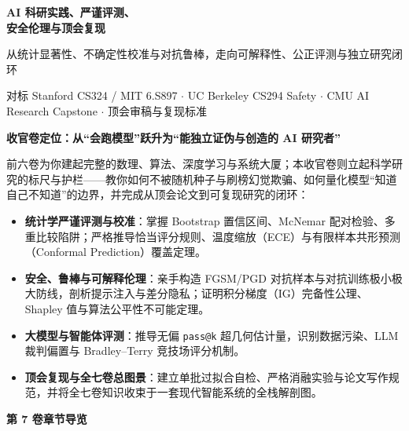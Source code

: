 \documentclass[UTF8,10.5pt,a4paper,oneside,fontset=fandol,scheme=plain]{ctexbook}
\begin{document}
{\fontsize{25}{33}\selectfont\sffamily\bfseries\color{ink}AI 科研实践、严谨评测、\\安全伦理与顶会复现}\par
\vspace{2.5mm}
{\large\sffamily\color{teal}从统计显著性、不确定性校准与对抗鲁棒，走向可解释性、公正评测与独立研究闭环}\par
\vspace{4.5mm}
{\small\color{slate}对标 Stanford CS324 / MIT 6.S897 $\cdot$ UC Berkeley CS294 Safety $\cdot$ CMU AI Research Capstone $\cdot$ \mbox{顶会审稿与复现标准}}\par

\vspace{5.5mm}

\begin{tcolorbox}[
  enhanced,
  colback=tealLight,
  colframe=tealLine,
  borderline west={2.6pt}{0pt}{tealDark},
  arc=2mm,
  boxrule=0.5pt,
  left=4.5mm,right=4.5mm,top=3mm,bottom=3mm
]
\textbf{\sffamily\color{tealDark}收官卷定位：从“会跑模型”跃升为“能独立证伪与创造的 AI 研究者”}\par\vspace{1.2mm}
\small
前六卷为你建起完整的数理、算法、深度学习与系统大厦；本收官卷则立起科学研究的标尺与护栏——教你如何不被随机种子与刷榜幻觉欺骗、如何量化模型“知道自己不知道”的边界，并完成从顶会论文到可复现研究的闭环：
\begin{itemize}
  \item \textbf{统计学严谨评测与校准}：掌握 Bootstrap 置信区间、McNemar 配对检验、多重比较陷阱；严格推导恰当评分规则、温度缩放（ECE）与有限样本共形预测（Conformal Prediction）覆盖定理。
  \item \textbf{安全、鲁棒与可解释伦理}：亲手构造 FGSM/PGD 对抗样本与对抗训练极小极大防线，剖析提示注入与差分隐私；证明积分梯度（IG）完备性公理、Shapley 值与算法公平性不可能定理。
  \item \textbf{大模型与智能体评测}：推导无偏 \texttt{pass@k} 超几何估计量，识别数据污染、LLM 裁判偏置与 Bradley--Terry 竞技场评分机制。
  \item \textbf{顶会复现与全七卷总图景}：建立单批过拟合自检、严格消融实验与论文写作规范，并将全七卷知识收束于一套现代智能系统的全栈解剖图。
\end{itemize}
\end{tcolorbox}

\vspace{4.5mm}

\noindent\textbf{\sffamily\color{tealDark}第 7 卷章节导览}
\vspace{1.5mm}
\end{document}
